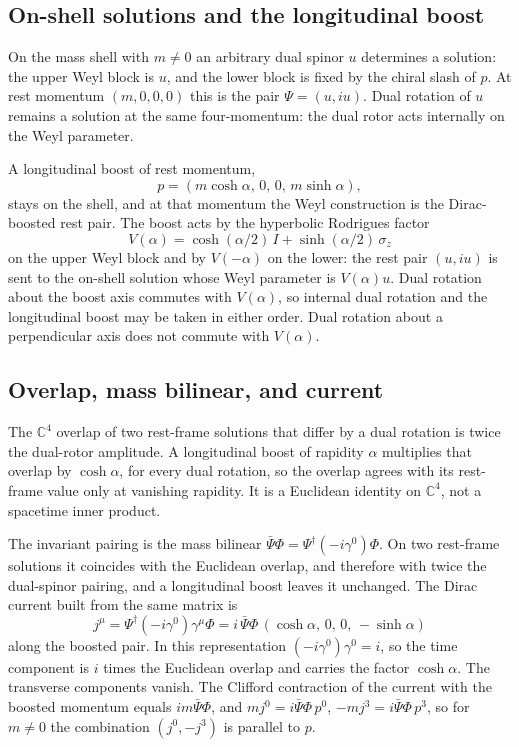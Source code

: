 \documentclass[a4paper]{article}
\begin{document}
\subsection{On-shell solutions and the longitudinal boost}

On the mass shell with $m\neq 0$ an arbitrary dual spinor $u$ determines a solution: the upper Weyl block is $u$, and the lower block is fixed by the chiral slash of $p$. At rest momentum $(m,0,0,0)$ this is the pair $\Psi=(u,iu)$. Dual rotation of $u$ remains a solution at the same four-momentum: the dual rotor acts internally on the Weyl parameter.

A longitudinal boost of rest momentum,
\[
p=(m\cosh\alpha,\,0,\,0,\,m\sinh\alpha),
\]
stays on the shell, and at that momentum the Weyl construction is the Dirac-boosted rest pair. The boost acts by the hyperbolic Rodrigues factor
\[
V(\alpha)=\cosh(\alpha/2)\,I+\sinh(\alpha/2)\,\sigma_z
\]
on the upper Weyl block and by $V(-\alpha)$ on the lower: the rest pair $(u,iu)$ is sent to the on-shell solution whose Weyl parameter is $V(\alpha)u$. Dual rotation about the boost axis commutes with $V(\alpha)$, so internal dual rotation and the longitudinal boost may be taken in either order. Dual rotation about a perpendicular axis does not commute with $V(\alpha)$.

\subsection{Overlap, mass bilinear, and current}

The $\mathbb{C}^4$ overlap of two rest-frame solutions that differ by a dual rotation is twice the dual-rotor amplitude. A longitudinal boost of rapidity $\alpha$ multiplies that overlap by $\cosh\alpha$, for every dual rotation, so the overlap agrees with its rest-frame value only at vanishing rapidity. It is a Euclidean identity on $\mathbb{C}^4$, not a spacetime inner product.

The invariant pairing is the mass bilinear $\bar\Psi\Phi=\Psi^\dagger(-i\gamma^0)\Phi$. On two rest-frame solutions it coincides with the Euclidean overlap, and therefore with twice the dual-spinor pairing, and a longitudinal boost leaves it unchanged. The Dirac current built from the same matrix is
\[
j^\mu=\Psi^\dagger(-i\gamma^0)\gamma^\mu\Phi
=i\,\bar\Psi\Phi\,(\cosh\alpha,\,0,\,0,\,-\sinh\alpha)
\]
along the boosted pair. In this representation $(-i\gamma^0)\gamma^0=i$, so the time component is $i$ times the Euclidean overlap and carries the factor $\cosh\alpha$. The transverse components vanish. The Clifford contraction of the current with the boosted momentum equals $im\bar\Psi\Phi$, and $mj^0=i\bar\Psi\Phi\,p^0$, $-mj^3=i\bar\Psi\Phi\,p^3$, so for $m\neq 0$ the combination $(j^0,-j^3)$ is parallel to $p$.
\end{document}
